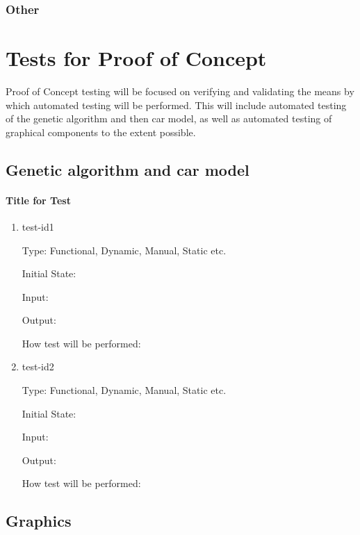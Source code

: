 \documentclass[12pt, titlepage]{article}
\begin{document}
\subsubsection{Other}



\section{Tests for Proof of Concept}

Proof of Concept testing will be focused on verifying and validating the means by which automated testing will be performed. This will include automated testing of the genetic algorithm and then car model, as well as automated testing of graphical components to the extent possible.

\subsection{Genetic algorithm and car model}
		
\paragraph{Title for Test}

\begin{enumerate}

\item{test-id1\\}

Type: Functional, Dynamic, Manual, Static etc.
					
Initial State: 
					
Input: 
					
Output: 
					
How test will be performed: 
					
\item{test-id2\\}

Type: Functional, Dynamic, Manual, Static etc.
					
Initial State: 
					
Input: 
					
Output: 
					
How test will be performed: 

\end{enumerate}

\subsection{Graphics}
\end{document}
